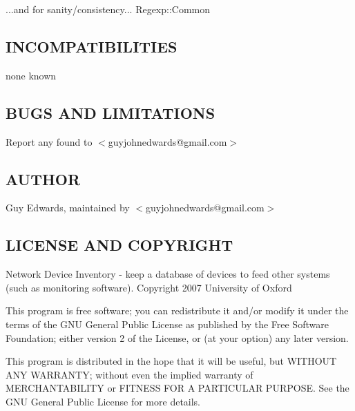 \documentclass{book}
\begin{document}
...and for sanity/consistency... Regexp::Common


\subsection{INCOMPATIBILITIES}
\label{Inventory_INCOMPATIBILITIES}
\hypertarget{Inventory_INCOMPATIBILITIES}{}



none known


\subsection{BUGS AND LIMITATIONS}
\label{Inventory_BUGS_AND_LIMITATIONS}
\hypertarget{Inventory_BUGS_AND_LIMITATIONS}{}



Report any found to $<$guyjohnedwards@gmail.com$>$


\subsection{AUTHOR}
\label{Inventory_AUTHOR}
\hypertarget{Inventory_AUTHOR}{}



Guy Edwards, maintained by $<$guyjohnedwards@gmail.com$>$


\subsection{LICENSE AND COPYRIGHT}
\label{Inventory_LICENSE_AND_COPYRIGHT}
\hypertarget{Inventory_LICENSE_AND_COPYRIGHT}{}



Network Device Inventory - keep a database of devices to feed other systems (such as monitoring software). Copyright 2007 University of Oxford



This program is free software; you can redistribute it and/or modify it under the terms of the GNU General Public License as published by the Free Software Foundation; either version 2 of the License, or (at your option) any later version.



This program is distributed in the hope that it will be useful, but WITHOUT ANY WARRANTY; without even the implied warranty of MERCHANTABILITY or FITNESS FOR A PARTICULAR PURPOSE. See the GNU General Public License for more details.
\end{document}
